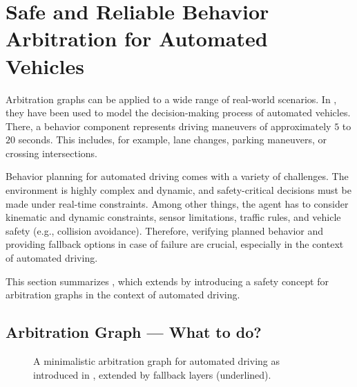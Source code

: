 \section{Safe and Reliable Behavior Arbitration for Automated Vehicles}




Arbitration graphs can be applied to a wide range of real-world scenarios.
In \cite{orzechowskiDecisionMakingAutomatedVehicles2020a},
they have been used to model the decision-making process of automated vehicles.
There, a behavior component represents driving maneuvers of approximately $5$ to $20$ seconds.
This includes, for example, lane changes, parking maneuvers, or crossing intersections.

Behavior planning for automated driving comes with a variety of challenges.
The environment is highly complex and dynamic, and safety-critical decisions must be made under real-time constraints.
Among other things, the agent has to consider kinematic and dynamic constraints,
sensor limitations, traffic rules, and vehicle safety (e.g., collision avoidance).
Therefore, verifying planned behavior and providing fallback options in case of failure are crucial,
especially in the context of automated driving.

This section summarizes \cite{orzechowskiVerhaltensentscheidungFuerAutomatisierte2023},
which extends \cite{orzechowskiDecisionMakingAutomatedVehicles2020a} by
introducing a safety concept for arbitration graphs in the context of automated driving.




\subsection{Arbitration Graph --- \textbf{What} to do?}

\begin{figure}
    \centering
    
    \caption{
        A minimalistic arbitration graph for automated driving as introduced in \cite{orzechowskiDecisionMakingAutomatedVehicles2020a}, extended by fallback layers (underlined).
    }
    \label{fig:arbitration-graph-evaluation}
\end{figure}

